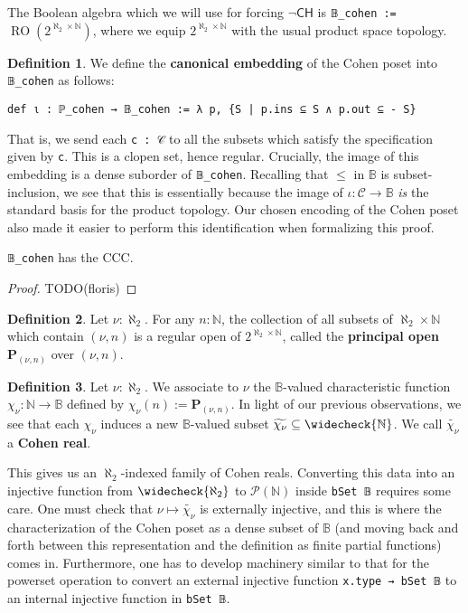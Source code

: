\documentclass[sigplan,10pt,review, autoref,anonymous]{acmart}
\newcommand{\B}{\mathbb{B}}
\newcommand{\lil}{\lstinline}
\newcommand{\N}{\mathbb{N}}
\theoremstyle{definition}
\newtheorem{defn}{Definition}[section]
\begin{document}
The Boolean algebra which we will use for forcing $\neg\mathsf{CH}$ is \lil{𝔹_cohen := } $\operatorname{RO}(2^{\aleph_2 \times \mathbb{N}})$, where we equip $2^{\aleph_2 \times \mathbb{N}}$ with the usual product space topology.

\begin{defn}
  We define the \textbf{canonical embedding} of the Cohen poset into \lil{𝔹_cohen} as follows:
  \begin{lstlisting}
def ι : ℙ_cohen → 𝔹_cohen := λ p, {S | p.ins ⊆ S ∧ p.out ⊆ - S}
\end{lstlisting}
\end{defn}
That is, we send each \lil{c : 𝒞} to all the subsets which satisfy the specification given by \lil{c}. This is a clopen set, hence regular. Crucially, the image of this embedding is a dense suborder of \lil{𝔹_cohen}. Recalling that $\leq$ in $\B$ is subset-inclusion, we see that this is essentially because the image of $\iota : \mathcal{C} \to \B$ \emph{is} the standard basis for the product topology. Our chosen encoding of the Cohen poset also made it easier to perform this identification when formalizing this proof.

\begin{lemma}\label{lemma-cohen-algebra-CCC}
  \lil{𝔹_cohen} has the CCC.
\end{lemma}

\begin{proof}
  TODO(floris)
\end{proof}

\begin{defn}
  Let $\nu : \aleph_2$. For any $n : \N$, the collection of all subsets of $\aleph_2 \times \N$ which contain $(\nu, n)$ is a regular open of $2^{\aleph_2 \times \N}$, called the \textbf{principal open} $\mathbf{P}_{(\nu, n)}$ over $(\nu, n)$.
\end{defn}

\begin{defn}
  Let $\nu : \aleph_2$. We associate to $\nu$ the $\B$-valued characteristic function $\chi_{\nu} : \N \to \B$ defined by $\chi_{\nu}(n) := \mathbf{P}_{(\nu, n)}$. In light of our previous observations, we see that each $\chi_{\nu}$ induces a new $\B$-valued subset $\widetilde{\chi_{\nu}} \subseteq \widecheck{\N}$. We call $\widetilde{\chi_{\nu}}$ a \textbf{Cohen real}.
\end{defn}
This gives us an $\aleph_2$-indexed family of Cohen reals. Converting this data into an injective function from \(\widecheck{\aleph_2}\) to $\mathcal{P}(\mathbb{N})$ inside \lil{bSet 𝔹} requires some care. One must check that $\nu \mapsto \widetilde{\chi_{\nu}}$ is externally injective, and this is where the characterization of the Cohen poset as a dense subset of $\B$ (and moving back and forth between this representation and the definition as finite partial functions) comes in. Furthermore, one has to develop machinery similar to that for the powerset operation to convert an external injective function \lstinline{x.type → bSet 𝔹} to an internal injective function in \lstinline{bSet 𝔹}.  %
\end{document}
